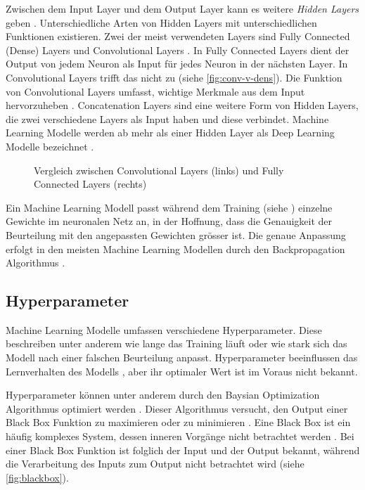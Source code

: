 Zwischen dem Input Layer und dem Output Layer kann es weitere \emph{Hidden
Layers} geben \cite{malik_what_2019}. Unterschiedliche Arten von Hidden Layers
mit unterschiedlichen Funktionen existieren. Zwei der meist verwendeten Layers
sind Fully Connected (Dense) Layers und Convolutional Layers
\cite{unzueta_convolutional_2022}. In Fully Connected Layers dient der Output
von jedem Neuron als Input für jedes Neuron in der nächsten Layer. In
Convolutional Layers trifft das nicht zu (siehe \autoref{fig:conv-v-dens}). Die
Funktion von Convolutional Layers umfasst, wichtige Merkmale aus dem Input
hervorzuheben \cite{deshpande_beginners_nodate}. Concatenation Layers
\cite{jayawardana_concatenating_2021} sind eine weitere Form von Hidden Layers,
die zwei verschiedene Layers als Input haben und diese verbindet. Machine
Learning Modelle werden ab mehr als einer Hidden Layer als Deep Learning Modelle
bezeichnet \cite{jan-dirk_kranz_deep_2019}.
 
\begin{figure}[!ht]
   \centering
   \caption{Vergleich zwischen Convolutional Layers (links) und Fully Connected Layers (rechts) \cite{unzueta_convolutional_2022}}\label{fig:conv-v-dens}
\end{figure}
 
Ein Machine Learning Modell passt während dem Training (siehe
) einzelne Gewichte im neuronalen Netz an, in der Hoffnung,
dass die Genauigkeit der Beurteilung mit den angepassten Gewichten grösser
ist. Die genaue Anpassung erfolgt in den meisten Machine Learning Modellen durch
den Backpropagation Algorithmus
\cite{ognjanovski_everything_2020}\cite{david_e_rumelhart_learning_nodate}.
 
 
 
\subsection{Hyperparameter}\label{sub:t_ml_hyper}
Machine Learning Modelle umfassen verschiedene Hyperparameter. Diese beschreiben
unter anderem wie lange das Training läuft oder wie stark sich das Modell nach
einer falschen Beurteilung anpasst. Hyperparameter beeinflussen das
Lernverhalten des Modells \cite{nyuytiymbiy_parameters_2022}, aber ihr
optimaler Wert ist im Voraus nicht bekannt.
 
Hyperparameter können unter anderem durch den Baysian Optimization Algorithmus
optimiert werden \cite{agnihotri_exploring_2020}\cite{paretos_bayesian_2021}.
Dieser Algorithmus versucht, den Output einer Black Box Funktion zu maximieren
oder zu minimieren \cite[S. 15]{garnett_bayesian_nodate}. Eine Black Box ist ein
häufig komplexes System, dessen inneren Vorgänge nicht betrachtet werden
\cite{noauthor_black_2021}. Bei einer Black Box Funktion ist folglich der Input
und der Output bekannt, während die Verarbeitung des Inputs zum Output nicht
betrachtet wird (siehe \autoref{fig:blackbox}).
 
